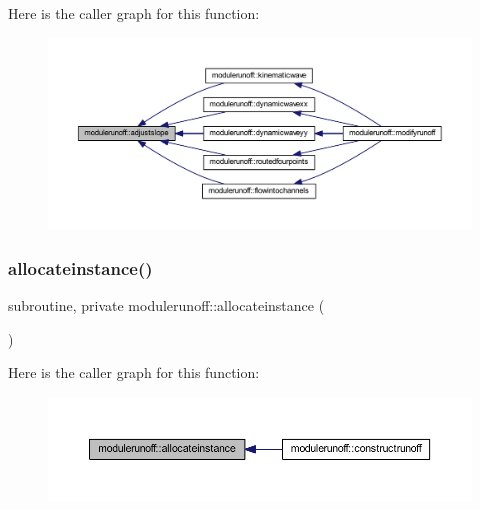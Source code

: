 Here is the caller graph for this function\+:\nopagebreak
\begin{figure}[H]
\begin{center}
\leavevmode
\includegraphics[width=350pt]{namespacemodulerunoff_a5ac5c14875a2f0f2791e37f40b4321ea_icgraph}
\end{center}
\end{figure}
\mbox{\label{namespacemodulerunoff_a41e3ad5c7c0c951e239b6f330bf1dfec}} 
\subsubsection{\texorpdfstring{allocateinstance()}{allocateinstance()}}
{\footnotesize\ttfamily subroutine, private modulerunoff\+::allocateinstance (\begin{DoxyParamCaption}{ }\end{DoxyParamCaption})\hspace{0.3cm}{\ttfamily [private]}}

Here is the caller graph for this function\+:\nopagebreak
\begin{figure}[H]
\begin{center}
\leavevmode
\includegraphics[width=350pt]{namespacemodulerunoff_a41e3ad5c7c0c951e239b6f330bf1dfec_icgraph}
\end{center}
\end{figure}
\mbox{\label{namespacemodulerunoff_a3a007b7a4dcf19d2d269172e36d996de}} 
